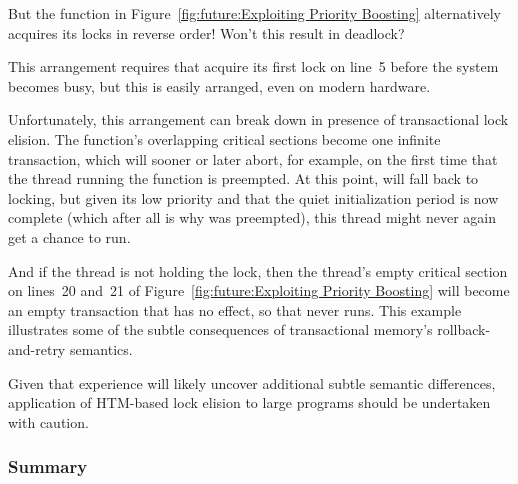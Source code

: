 \QuickQuiz{}
	But the  function in
	Figure~\ref{fig:future:Exploiting Priority Boosting}
	alternatively acquires its locks in reverse order!
	Won't this result in deadlock?
 \QuickQuizEnd

This arrangement requires that  acquire its first
lock on line~5 before the system becomes busy, but this is easily
arranged, even on modern hardware.

Unfortunately, this arrangement can break down in presence of transactional
lock elision.
The  function's overlapping critical sections become
one infinite transaction, which will sooner or later abort,
for example, on the first time that the thread running
the  function is preempted.
At this point,  will fall back to locking, but given
its low priority and that the quiet initialization period is now
complete (which after all is why  was preempted),
this thread might never again get a chance to run.

And if the  thread is not holding the lock, then
the  thread's empty critical section on lines~20 and~21 of
Figure~\ref{fig:future:Exploiting Priority Boosting}
will become an empty transaction that has no effect, so that
 never runs.
This example illustrates some of the subtle consequences of
transactional memory's rollback-and-retry semantics.

Given that experience will likely uncover additional subtle semantic
differences, application of HTM-based lock elision to large programs
should be undertaken with caution.

\subsubsection{Summary}
\label{sec:future:HTM Weaknesses WRT Locking: Summary}



